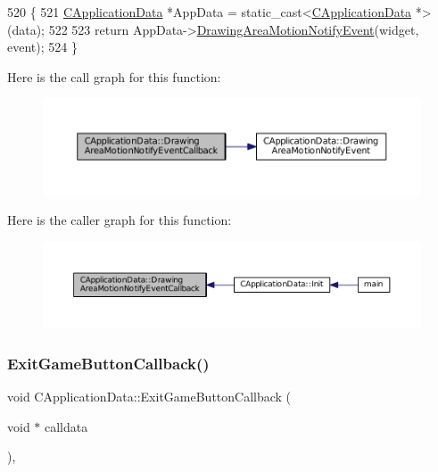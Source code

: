 \begin{DoxyCode}
520                                                                                                            
                 \{
521     \hyperlink{classCApplicationData}{CApplicationData} *AppData = \textcolor{keyword}{static\_cast<}\hyperlink{classCApplicationData}{CApplicationData} *\textcolor{keyword}{>}(data);
522 
523     \textcolor{keywordflow}{return} AppData->\hyperlink{classCApplicationData_a9b53201c01b399df18b02d1e93213e45}{DrawingAreaMotionNotifyEvent}(widget, event);
524 \}
\end{DoxyCode}
Here is the call graph for this function\+:
\nopagebreak
\begin{figure}[H]
\begin{center}
\leavevmode
\includegraphics[width=350pt]{classCApplicationData_a463a4bc8eabe67f9f22c46d96f5eff88_cgraph}
\end{center}
\end{figure}
Here is the caller graph for this function\+:
\nopagebreak
\begin{figure}[H]
\begin{center}
\leavevmode
\includegraphics[width=350pt]{classCApplicationData_a463a4bc8eabe67f9f22c46d96f5eff88_icgraph}
\end{center}
\end{figure}
\hypertarget{classCApplicationData_a6a2c934fee258ccdb2a4a70c075f79fd}{}\label{classCApplicationData_a6a2c934fee258ccdb2a4a70c075f79fd} 
\subsubsection{\texorpdfstring{Exit\+Game\+Button\+Callback()}{ExitGameButtonCallback()}}
{\footnotesize\ttfamily void C\+Application\+Data\+::\+Exit\+Game\+Button\+Callback (\begin{DoxyParamCaption}\item[{void $\ast$}]{calldata }\end{DoxyParamCaption})\hspace{0.3cm}{\ttfamily [static]}, {\ttfamily [protected]}}



